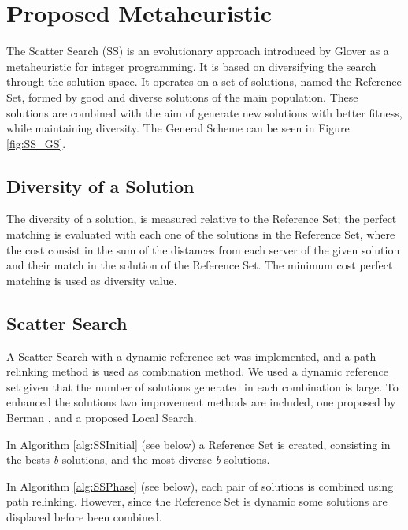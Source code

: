 \section{Proposed Metaheuristic}
The Scatter Search (SS)
is an evolutionary approach
introduced by Glover \cite{glover1977heuristics}
as a metaheuristic for integer programming.
It is based on diversifying the search
through the solution space.
It operates on a set of solutions,
named the Reference Set,
formed by good and diverse solutions of the main population.
These solutions are combined
with the aim of generate
new solutions with better fitness,
while maintaining diversity.
The General Scheme can be seen in Figure \ref{fig:SS_GS}.


\subsection{Diversity of a Solution}
The diversity of a solution,
is measured relative to the Reference Set;
the perfect matching
is evaluated
with each one of the solutions in the Reference Set,
where the cost consist in
the sum of the distances
from each server of the given solution
and their match in the solution of the Reference Set.
The minimum cost perfect matching
is used as diversity value.

\subsection{Scatter Search}
A Scatter-Search
with a dynamic reference set
was implemented,
and a path relinking method
is used as combination method.
We used a dynamic reference set
given that the number of solutions generated
in each combination is large.
To enhanced the solutions
two improvement methods are included,
one proposed by Berman \cite{berman1987stochastic},
and a proposed Local Search.

In Algorithm \ref{alg:SSInitial} (see below)
a Reference Set is created,
consisting in the bests \textit{b} solutions,
and the most diverse \textit{b} solutions.



In Algorithm \ref{alg:SSPhase} (see below),
each pair of solutions
is combined using path relinking.
However,
since the Reference Set is dynamic
some solutions are displaced
before been combined.

